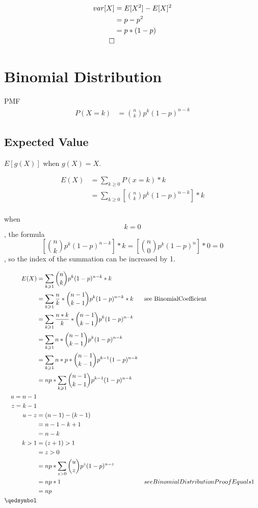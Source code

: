 \documentclass[]{book}
\begin{document}
\begin{align}
	var[X] &= E[X^2] - E[X]^2\\
	&= p - p^2\\
	&= p*(1-p)\\
	\qed
\end{align}


\section{Binomial Distribution}

PMF
\begin{align}
P(X=k) &= \binom{n} {k} p^k (1-p)^{n-k}
\end{align}


\subsection {Expected Value}

$E[g(X)]$ when $g(X) = X$.

\begin{align}
E(X) &= \sum_{k \geqslant 0}P(x=k)*k\\
&= \sum_{k \geqslant 0}[\binom{n} {k} p^k (1-p)^{n-k}] * k\\
\end{align}

when $$k=0$$, the formula $$[\binom{n} {k} p^k (1-p)^{n-k}] * k = [\binom{n} {0} p^k (1-p)^n] * 0 = 0$$, so the index of the summation can be increased by 1.

\begin{align}
E(X) &= \sum_{k \geqslant 1} \binom{n}{k} p^k (1-p)^{n-k} * k\\
&= \sum_{k \geqslant 1} \frac{n}{k} * \binom{n-1}{k-1} p^k (1-p)^{n-k} * k && \text{see BinomialCoefficient}\\
&= \sum_{k \geqslant 1} \frac{n*k}{k} * \binom{n-1}{k-1} p^k (1-p)^{n-k}\\
&= \sum_{k \geqslant 1} n * \binom{n-1}{k-1} p^k (1-p)^{n-k}\\
&= \sum_{k \geqslant 1} n*p * \binom{n-1}{k-1} p^{k-1} (1-p)^{n-k}\\
&= np * \sum_{k \geqslant 1} \binom{n-1}{k-1} p^{k-1} (1-p)^{n-k}\\
u = n-1\\
z = k-1\\
u-z&=(n-1)-(k-1)\\
&=n-1-k+1\\
&=n-k\\
k>1&=(z+1)>1\\
&=z>0\\
&= np * \sum_{z>0} \binom{u}{z} p^{z} (1-p)^{u-z}\\
&= np * 1 && see BinomialDistributionProofEquals1\\
&= np\\
\qedsymbol
\end{align}
\end{document}
